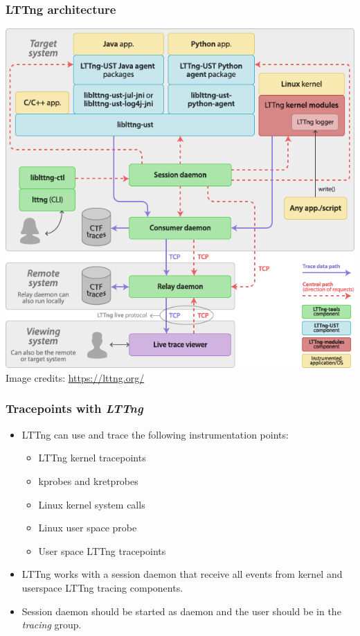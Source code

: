 \begin{frame}[fragile]
  \frametitle{LTTng architecture}
  \begin{center}
    \includegraphics[height=0.8\textheight]{slides/debugging-system-wide-profiling/lttng_graph.png}\\
    \tiny Image credits: \url{https://lttng.org/}
  \end{center}
\end{frame}

\begin{frame}
  \frametitle{Tracepoints with {\em LTTng} }
  \begin{itemize}
    \item LTTng can use and trace the following instrumentation points:
    \begin{itemize}
      \item LTTng kernel tracepoints
      \item kprobes and kretprobes
      \item Linux kernel system calls
      \item Linux user space probe
      \item User space LTTng tracepoints
    \end{itemize}
    \item LTTng works with a session daemon that receive all events from kernel
          and userspace LTTng tracing components.
    \item Session daemon should be started as daemon and the user should be in
          the {\em tracing} group.
  \end{itemize}
\end{frame}

